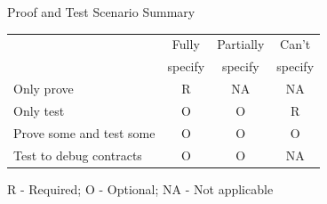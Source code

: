 \documentclass{beamer}
\begin{document}
\begin{frame}[fragile]{Proof and Test Scenario Summary}
\begin{center}
\begin{tabular}{p{3.8cm} | c | c | c }
    & Fully & Partially & Can't \\
    & specify & specify & specify \\
  \hline
  Only prove & R & NA & NA \\
  \hline
  Only test & O & O & R \\
  \hline
  \raggedright Prove some and test some & O & O & O \\
  \hline
  Test to debug contracts & O & O & NA \\
\end{tabular}

\vspace{1cm}
R - Required; O - Optional; NA - Not applicable
\end{center}

\end{frame}
\end{document}
